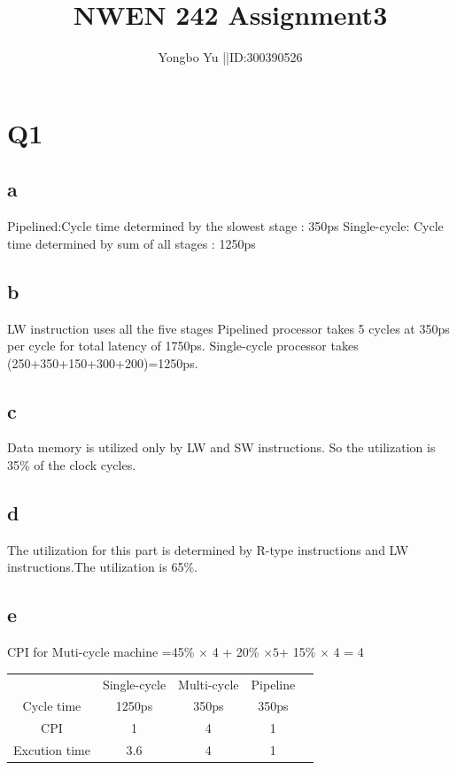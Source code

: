 \documentclass[]{article}
\title{NWEN 242 Assignment3}
\author{Yongbo Yu ||ID:300390526
}
\begin{document}
\maketitle
\section*{Q1}
\subsection*{a}
Pipelined:Cycle time determined by the slowest stage : 350ps\newline
Single-cycle: Cycle time determined by sum of all stages : 1250ps\newline
\subsection*{b}
LW instruction uses all the five stages \newline
Pipelined processor takes 5 cycles at 350ps per cycle for total latency of 1750ps.\newline
Single-cycle processor takes (250+350+150+300+200)=1250ps.\newline
\subsection*{c}
Data memory is utilized only by LW and SW instructions. So the utilization is 35\% of the clock cycles.

\subsection*{d}
The utilization for this part is determined by R-type instructions and LW instructions.The utilization is 65\%.  
\subsection*{e}
CPI for Muti-cycle machine =45\% $\times$ 4 + 20\% $\times 5 $+ 15\% $\times$ 4 = 4\newline
\begin{center}
	\begin{tabular}{c c c c c }
		&Single-cycle &Multi-cycle & Pipeline \\
		Cycle time&1250ps&350ps&350ps\\
	     CPI&1&4&1\\
	     Excution time &3.6&4&1\\
		
	\end{tabular}
	
\end{center}
\end{document}
